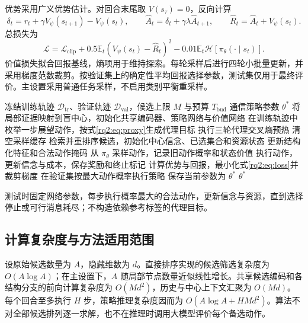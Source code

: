优势采用广义优势估计\cite{gae}。对回合末尾取 $V(s_{\tau})=0$，反向计算
\begin{equation}
\delta_t=r_t+\gamma V_\psi(s_{t+1})-V_\psi(s_t),\qquad
\widehat A_t=\delta_t+\gamma\lambda\widehat A_{t+1},\qquad
\widehat R_t=\widehat A_t+V_\psi(s_t).
\label{rq2:eq:gae}
\end{equation}
总损失为
\begin{equation}
\mathcal L=\mathcal L_{\mathrm{clip}}+
0.5\mathbb E_t(V_\psi(s_t)-\widehat R_t)^2
-0.01\mathbb E_t\mathcal H[\pi_\theta(\cdot\mid s_t)].
\label{rq2:eq:loss}
\end{equation}
价值损失拟合回报基线，熵项用于维持探索。每轮采样后进行四轮小批量更新，并采用梯度范数裁剪。按验证集上的确定性平均回报选择参数，测试集仅用于最终评价。主设置采用普通任务采样，不启用类别平衡重采样。

\begin{algorithm}[htbp]
\caption{EviComRL 的策略训练过程}
\label{rq2:alg:training}
\begin{algorithmic}[1]
\Require 冻结训练轨迹 $\mathcal D_{\mathrm{tr}}$、验证轨迹 $\mathcal D_{\mathrm{val}}$，候选上限 $M$ 与预算 $T_{\mathrm{bud}}$
\Ensure 通信策略参数 $\theta^*$
\State 将局部证据映射到盲中心，初始化共享编码器、策略网络与价值网络
\State 在训练轨迹中枚举一步展望动作，按式\eqref{rq2:eq:proxy}生成代理目标
\State 执行三轮代理交叉熵预热
  \State 清空采样缓存
    \State 检索并重排序候选，初始化中心信念、已选集合和资源状态
      \State 更新结构化特征和合法动作掩码
      \State 从 $\pi_\theta$ 采样动作，记录旧动作概率和状态价值
      \State 执行动作，更新信念与成本，保存奖励和终止标记
    \EndWhile
  \EndFor
  \State 计算优势与回报，最小化式\eqref{rq2:eq:loss}并裁剪梯度
  \State 在验证集按最大动作概率执行策略
    \State 保存当前参数为 $\theta^*$
  \EndIf
\EndFor
\State \Return $\theta^*$
\end{algorithmic}
\end{algorithm}

测试时固定网络参数，每步执行概率最大的合法动作，更新信念与资源，直到选择停止或可行消息耗尽；不构造依赖参考标签的代理目标。

\subsection{计算复杂度与方法适用范围}
设原始候选数量为 $A$，隐藏维数为 $d$。直接排序实现的候选筛选复杂度为 $O(A\log A)$；在主设置下，$A$ 随局部节点数量近似线性增长。共享候选编码和各结构分支的前向计算复杂度为 $O(Md^2)$，历史与中心上下文汇聚为 $O(Md)$。每个回合至多执行 $H$ 步，策略推理复杂度因而为 $O(A\log A+HMd^2)$。算法不对全部候选排列逐一求解，也不在推理时调用大模型评价每个备选动作。

